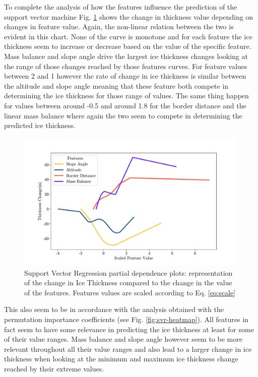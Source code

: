 To complete the analysis of how the features influence the prediction of the support vector machine Fig. \ref{fig:svr-pdp} shows the change in thickness value depending on changes in feature value. Again, the non-linear relation between the two is evident in this chart.  None of the curve is monotone and for each feature the ice thickness seem to increase or decrease based on the value of the specific feature. Mass balance and slope angle drive the largest ice thickness changes looking at the range of those changes reached by those features curves. For feature values between 2 and 1 however the rate of change in ice thickness is similar between the altitude and slope angle meaning that these feature both compete in determining the ice thickness for those range of values. The same thing happen for values between around -0.5 and around 1.8 for the border distance and the linear mass balance where again the two seem to compete in determining the predicted ice thickness.
\begin{figure}[!tp]
	\centering		  
	\includegraphics[width=1.\textwidth]{figures/SVR_pdp.pdf}
	\caption{Support Vector Regression partial dependence plots: representation of the change in Ice Thickness compared to the change in the value of the features. Features values are scaled according to Eq. \ref{eq:scale}}
	\label{fig:svr-pdp}
\end{figure}

This also seem to be in accordance with the analysis obtained with the permutation importance coefficients (see Fig. \ref{fig:svr-heatmap}). All features in fact seem to have some relevance in predicting the ice thickness at least for some of their value ranges. Mass balance and slope angle however seem to be more relevant throughout all their value ranges and also lead to a larger change in ice thickness when looking at the minimum and maximum ice thickness change reached by their extreme values. 


